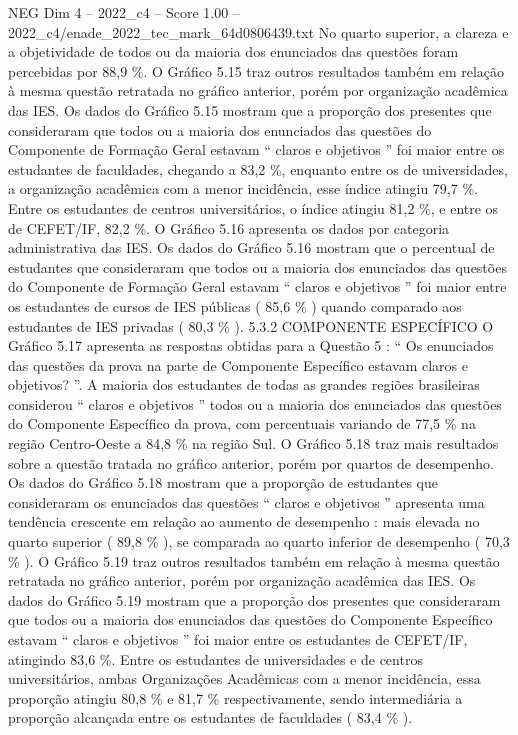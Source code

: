 \begin{textsample}{NEG Dim 4 – 2022\_c4 – Score 1.00 – 2022\_c4/enade\_2022\_tec\_mark\_64d0806439.txt}
No quarto superior, a clareza e a objetividade de todos ou da maioria dos enunciados das questões foram percebidas por 88,9 \%.
O Gráfico 5.15 traz outros resultados também em relação à mesma questão retratada no gráfico anterior, porém por organização acadêmica das IES.
Os dados do Gráfico 5.15 mostram que a proporção dos presentes que consideraram que todos ou a maioria dos enunciados das questões do Componente de Formação Geral estavam “ claros e objetivos ” foi maior entre os estudantes de faculdades, chegando a 83,2 \%, enquanto entre os de universidades, a organização acadêmica com a menor incidência, esse índice atingiu 79,7 \%.
Entre os estudantes de centros universitários, o índice atingiu 81,2 \%, e entre os de CEFET/IF, 82,2 \%.
O Gráfico 5.16 apresenta os dados por categoria administrativa das IES.
Os dados do Gráfico 5.16 mostram que o percentual de estudantes que consideraram que todos ou a maioria dos enunciados das questões do Componente de Formação Geral estavam “ claros e objetivos ” foi maior entre os estudantes de cursos de IES públicas ( 85,6 \% ) quando comparado aos estudantes de IES privadas ( 80,3 \% ). 5.3.2 COMPONENTE ESPECÍFICO O Gráfico 5.17 apresenta as respostas obtidas para a Questão 5 : “ Os enunciados das questões da prova na parte de Componente Específico estavam claros e objetivos? ”.
A maioria dos estudantes de todas as grandes regiões brasileiras considerou “ claros e objetivos ” todos ou a maioria dos enunciados das questões do Componente Específico da prova, com percentuais variando de 77,5 \% na região Centro-Oeste a 84,8 \% na região Sul.
O Gráfico 5.18 traz mais resultados sobre a questão tratada no gráfico anterior, porém por quartos de desempenho.
Os dados do Gráfico 5.18 mostram que a proporção de estudantes que consideraram os enunciados das questões “ claros e objetivos ” apresenta uma tendência crescente em relação ao aumento de desempenho : mais elevada no quarto superior ( 89,8 \% ), se comparada ao quarto inferior de desempenho ( 70,3 \% ).
O Gráfico 5.19 traz outros resultados também em relação à mesma questão retratada no gráfico anterior, porém por organização acadêmica das IES.
Os dados do Gráfico 5.19 mostram que a proporção dos presentes que consideraram que todos ou a maioria dos enunciados das questões do Componente Específico estavam “ claros e objetivos ” foi maior entre os estudantes de CEFET/IF, atingindo 83,6 \%.
Entre os estudantes de universidades e de centros universitários, ambas Organizações Acadêmicas com a menor incidência, essa proporção atingiu 80,8 \% e 81,7 \% respectivamente, sendo intermediária a proporção alcançada entre os estudantes de faculdades ( 83,4 \% ).

\end{textsample}
